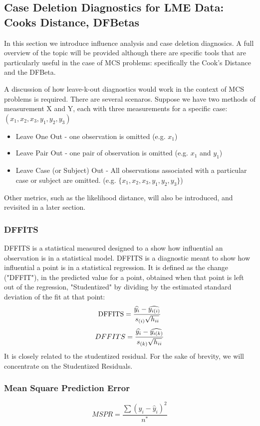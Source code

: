 \documentclass[12pt, a4paper]{report}
\theoremstyle{plain}
\theoremstyle{definition}
\theoremstyle{remark}
\begin{document}
	
	\subsection*{Case Deletion Diagnostics for LME Data: Cooks Distance, DFBetas}
	In this section we introduce influence analysis and case deletion diagnosics. A full overview of the topic will be provided although there are specific tools that are particularly useful in the case of MCS problems: specifically the Cook's Distance and the DFBeta.
	
	A discussion of how leave-k-out diagnostics would work in the context of MCS problems is required. There are several scenaros. Suppose we have two methods of measurement X and Y, each with three measurements for a specific case: $(x_1,x_2,x_3,y_1,y_2,y_3)$
	
	\begin{itemize}
		\item Leave One Out - one observation is omitted (e.g. $x_1$)
		\item Leave Pair Out - one pair of observation  is omitted (e.g. $x_1$ and $y_1$)
		\item Leave Case (or Subject) Out - All observations associated with a particular case or subject are omitted. (e.g. $\{x_1,x_2,x_3,y_1,y_2,y_3\}$)
	\end{itemize}
	Other metrics, such as the likelihood distance, will also be introduced, and revisited in a later section.


	\subsubsection{DFFITS} %
	DFFITS is a statistical measured designed to a show how influential an observation is in a statistical model. DFFITS is a diagnostic meant to show how influential a point is in a statistical regression. It is defined as the change ("DFFIT"), in the predicted value for a point, obtained when that point is left out of the regression, "Studentized" by dividing by the estimated standard deviation of the fit at that point:
	\[ \mbox{DFFITS} = {\widehat{y_i} - \widehat{y_{i(i)}} \over s_{(i)} \sqrt{h_{ii}}}\]
	\begin{displaymath} DFFITS = {\widehat{y_i} -
		\widehat{y_{i(k)}} \over s_{(k)} \sqrt{h_{ii}}} \end{displaymath}
	It is closely related to the studentized residual. For the sake of brevity, we will concentrate on the Studentized Residuals.
	
	\subsubsection{Mean Square Prediction Error}
	\begin{equation}
	MSPR = \frac{\sum (y_{i}-\hat{y}_{i})^2}{n^*}
	\end{equation}
	
\end{document}
